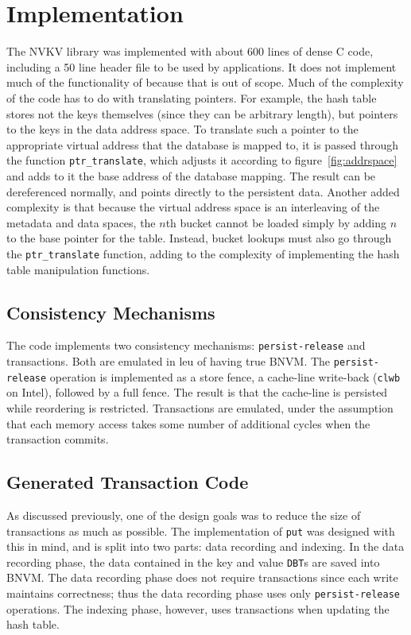 \section{Implementation}

The NVKV library was implemented with about 600 lines of dense C code, including
a 50 line header file to be used by applications. It does not implement much of
the functionality of \bdb because that is out of scope. Much of the complexity
of the code has to do with translating pointers. For example, the hash table
stores not the keys themselves (since they can be arbitrary length), but
pointers to the keys in the data address space. To translate such a pointer to
the appropriate virtual address that the database is mapped to, it is passed
through the function \texttt{ptr\_translate}, which adjusts it according to
figure~\ref{fig:addrspace} and adds to it the base address of the database
mapping. The result can be dereferenced normally, and points directly to the
persistent data. Another added complexity is that because the virtual address
space is an interleaving of the metadata and data spaces, the $n$th bucket
cannot be loaded simply by adding $n$ to the base pointer for the table.
Instead, bucket lookups must also go through the \texttt{ptr\_translate}
function, adding to the complexity of implementing the hash table manipulation
functions.

\subsection{Consistency Mechanisms}

The code implements two consistency mechanisms: \texttt{persist-release} and
transactions. Both are emulated in leu of having true BNVM. The
\texttt{persist-release} operation is implemented as a store fence, a cache-line
write-back (\texttt{clwb} on Intel), followed by a full fence. The result is
that the cache-line is persisted while reordering is restricted. Transactions
are emulated, under the assumption that each memory access takes some number of
additional cycles when the transaction commits.


\subsection{Generated Transaction Code}

As discussed previously, one of the design goals was to reduce the size of
transactions as much as possible. The implementation of \texttt{put} was
designed with this in mind, and is split into two parts: data recording and
indexing. In the data recording phase, the data contained in the key and value
\texttt{DBT}s are saved into BNVM.
The data recording
phase does not require transactions since each write maintains correctness; thus
the data recording phase uses only \texttt{persist-release} operations. The
indexing phase, however, uses transactions when updating the hash table.

